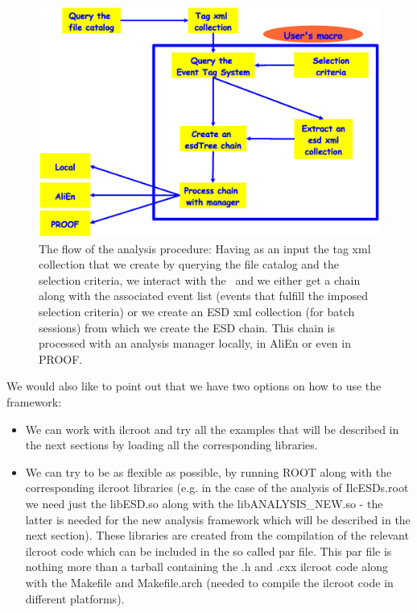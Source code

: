 \begin{figure}[ht!]
\begin{center}
\includegraphics[width=0.7\textheight]{figures/Flow.eps}
\end{center}
\caption{The flow of the analysis procedure: Having as an input the tag xml collection that we create by querying the file catalog and the selection criteria, we interact with the \tag\ and we either get a chain along with the associated event list (events that fulfill the imposed selection criteria) or we create an ESD xml collection (for batch sessions) from which we create the ESD chain. This chain is processed with an analysis manager locally, in AliEn or even in PROOF.}
\label{Note:FigAnalysisFlow}
\end{figure}

We would also like to point out that we have two options on how to use the framework:

\begin{itemize}
\item We can work with ilcroot and try all the examples that will be described in the next sections by loading all the corresponding libraries.
\item We can try to be as flexible as possible, by running ROOT along with the corresponding ilcroot libraries (e.g. in the case of the analysis of IlcESDs.root we need just the libESD.so along with the libANALYSIS\_NEW.so - the latter is needed for the new analysis framework which will be described in the next section). These libraries are created from the compilation of the relevant ilcroot code which can be included in the so called {\ttfamily par file}. This par file is nothing more than a tarball containing the .h and .cxx ilcroot code along with the Makefile and Makefile.arch (needed to compile the ilcroot code in different platforms).
\end{itemize}

